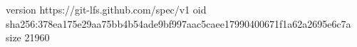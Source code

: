 version https://git-lfs.github.com/spec/v1
oid sha256:378ea175e29aa75bb4b54ade9bf997aac5caee17990400671f1a62a2695e6c7a
size 21960
